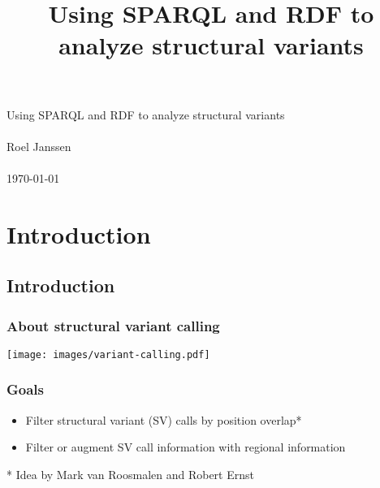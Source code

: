 \documentclass[11pt,aspectratio=169]{beamer} %
\author{}
\title{Using SPARQL and RDF to analyze structural variants}
\begin{document}
\beamertemplatenavigationsymbolsempty

\begin{frame}

  { \color{white}
    \par
    \LARGE Using SPARQL and RDF to analyze structural variants
    \normalsize
    ~\\
    ~\\
    Roel Janssen
    ~\\
    ~\\
    \today}

\end{frame}



\section{Introduction}

\subsection{Introduction}

\begin{frame}
  \frametitle{About structural variant calling}
  \begin{center}
    \texttt{[image: images/variant-calling.pdf]}
  \end{center}
\end{frame}

\begin{frame}
  \frametitle{Goals}

  \begin{itemize}
    \item Filter structural variant (SV) calls by position overlap*
    \item Filter or augment SV call information with regional information
  \end{itemize}

  \small{* Idea by Mark van Roosmalen and Robert Ernst}

\end{frame}
\end{document}
